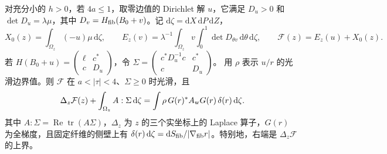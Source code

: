 对充分小的 $h>0$，若 $4a\le1$，取零边值的 Dirichlet 解 $u$，它满足 $D_u>0$ 和 $\det D_u=\lambda\mu$，其中 $D_v=H_{\rm fib}(B_0+v)$。记 $\mathrm d\zeta=\mathrm dX\,\mathrm dP\,\mathrm dZ$，
\[
 X_0(z)=\int_{\Omega_z}(-u)\mu\,\mathrm d\zeta,\qquad
 E_z(v)=\lambda^{-1}\int_{\Omega_z}v\int_0^1\det D_{\theta v}\,\mathrm d\theta\,\mathrm d\zeta,\qquad
 \mathcal F(z)=E_z(u)+X_0(z).
\]
若 $H(B_0+u)=\begin{pmatrix}\ell&c^*\\c&D_u\end{pmatrix}$，令
$\Sigma=\begin{pmatrix}c^*D_u^{-1}c&c^*\\c&D_u\end{pmatrix}$。
用 $\rho$ 表示 $u/r$ 的光滑边界值。则 $\mathcal F$ 在 $a<|\tau|<4$、$\Sigma\ge0$ 时光滑，且
\[
 \Delta_z\mathcal F(z)+\int_{\Omega_z} A:\Sigma\,\mathrm d\zeta
 =\int \rho\, G(r)^*A_{\rm w}G(r)\,\delta(r)\,\mathrm d\zeta .
\]
其中 $A:\Sigma=\operatorname{Re}\operatorname{tr}(A\Sigma)$，$\Delta_z$ 为 $z$ 的三个实坐标上的 Laplace 算子，$G(r)$ 为全梯度，且固定纤维的侧壁上有 $\delta(r)\,\mathrm d\zeta=\mathrm dS_{\rm fib}/|\nabla_{\rm fib}r|$。特别地，右端是 $\Delta_z\mathcal F$ 的上界。
